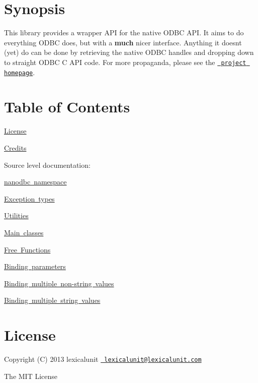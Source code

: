 \hypertarget{index_synopsis}{}\section{Synopsis}\label{index_synopsis}
This library provides a wrapper A\+PI for the native O\+D\+BC A\+PI. It aims to do everything O\+D\+BC does, but with a {\bfseries{much}} nicer interface. Anything it doesn\textquotesingle{}t (yet) do can be done by retrieving the native O\+D\+BC handles and dropping down to straight O\+D\+BC C A\+PI code. For more propaganda, please see the \href{http://nanodbc.io/}{\texttt{ project homepage}}.\hypertarget{index_toc}{}\section{Table of Contents}\label{index_toc}

\begin{DoxyItemize}
\item \mbox{\hyperlink{index_license}{License}}
\item \mbox{\hyperlink{index_credits}{Credits}}
\item Source level documentation\+:
\begin{DoxyItemize}
\item \mbox{\hyperlink{namespacenanodbc}{nanodbc namespace}}
\item \mbox{\hyperlink{group__exceptions}{Exception types}}
\item \mbox{\hyperlink{group__utility}{Utilities}}
\item \mbox{\hyperlink{group__mainc}{Main classes}}
\item \mbox{\hyperlink{group__mainf}{Free Functions}}
\item \mbox{\hyperlink{group__binding}{Binding parameters}}
\item \mbox{\hyperlink{group__bind__multi}{Binding multiple non-\/string values}}
\item \mbox{\hyperlink{group__bind__strings}{Binding multiple string values}}
\end{DoxyItemize}
\end{DoxyItemize}\hypertarget{index_license}{}\section{License}\label{index_license}
 Copyright (C) 2013 lexicalunit \href{mailto:lexicalunit@lexicalunit.com}{\texttt{ lexicalunit@lexicalunit.\+com}}

The M\+IT License


